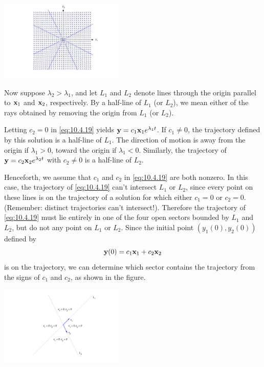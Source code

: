 \documentclass{ximera}
\begin{document}
\begin{image}
 \includegraphics[height=1.5in]{fig100402.jpg} 
\end{image}

Now suppose   $\lambda_2>\lambda_1$, and let $L_1$ and $L_2$ denote
lines through the origin parallel to ${\bf x}_1$ and ${\bf x}_2$,
respectively. By a half-line of $L_1$ (or $L_2$), we mean either of the
rays obtained by removing the origin from $L_1$ (or $L_2$).

Letting $c_2=0$ in \eqref{eq:10.4.19} yields ${\bf y}=c_1{\bf
x}_1e^{\lambda_1 t}$. If $c_1\neq 0$, the trajectory defined by this
solution is a half-line of $L_1$. The direction of motion is away from
the origin if $\lambda_1>0$, toward the origin if $\lambda_1<0$.
Similarly, the trajectory of  ${\bf y}=c_2{\bf x}_2e^{\lambda_2 t}$
with $c_2\neq 0$ is a half-line of $L_2$.

Henceforth, we assume that $c_1$ and $c_2$ in \eqref{eq:10.4.19} are both
nonzero. In this case, the trajectory of \eqref{eq:10.4.19} can't
intersect
$L_1$ or $L_2$, since every point on these lines is on the trajectory
of a solution for which either $c_1=0$ or $c_2=0$. (Remember: distinct
trajectories can't intersect!). Therefore the trajectory of
\eqref{eq:10.4.19} must lie entirely in one of the four open sectors
bounded by $L_1$ and $L_2$, but do not any point  on $L_1$ or
$L_2$. Since the initial point $(y_1(0),y_2(0))$ defined by
$$
{\bf y}(0)=c_1{\bf x}_1+c_2{\bf x}_2
$$
is on the trajectory, we can determine which sector contains the
trajectory from the signs of $c_1$ and $c_2$,
as shown in the figure.

\begin{image}
 \includegraphics[height=1.5in]{fig100403.jpg} 
\end{image}
\end{document}
